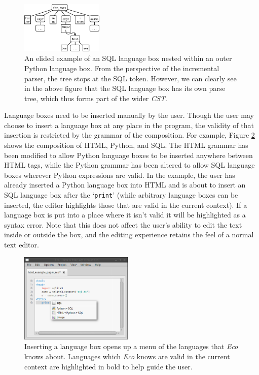 \documentclass[sigplan,screen]{acmart}\settopmatter{printfolios=true,printccs=false,printacmref=false}
\newcommand{\inputtree}[0]{\emph{CST}\xspace}
\newcommand{\eco}[0]{\emph{Eco}\xspace}
\begin{document}
\begin{figure}[t]
\begin{center}
\includegraphics[width=0.35\textwidth]{images/lboxtree}
\caption{An elided example of an SQL language box nested within an outer Python
language box. From the perspective of the incremental parser, the tree stops
at the SQL token. However, we can
clearly see in the above figure that the SQL language box has its own parse
tree, which thus forms part of the wider \inputtree.}
\label{fig:lboxtree}
\end{center}
\end{figure}

Language boxes need to be inserted manually by the user. Though the user may
choose to insert a language box at any place in the program, the validity of
that insertion is restricted by the grammar of the composition. For example,
Figure \ref{fig:langmenu} shows the composition of HTML, Python, and SQL.  The
HTML grammar has been modified to allow Python language boxes to be inserted
anywhere between HTML tags, while the Python grammar has been altered to allow
SQL language boxes wherever Python expressions are valid.  In the example, the
user has already inserted a Python language box into HTML and is about to
insert an SQL language box after the `\texttt{print}' (while arbitrary language
boxes can be inserted, the editor highlights those that are valid in the
current context). If a language box is put into a place where it isn't valid it
will be highlighted as a syntax error. Note that this does not affect the
user's ability to edit the text inside or outside the box, and the editing
experience retains the feel of a normal text editor.

\begin{figure}[t]
\begin{center}
\includegraphics[width=0.48\textwidth]{images/dropdown.png}
\caption{Inserting a language box opens up a menu of the languages that \eco
knows about. Languages which \eco knows are valid in the current context are
highlighted in bold to help guide the user.}
\label{fig:langmenu}
\end{center}
\end{figure}
\end{document}
